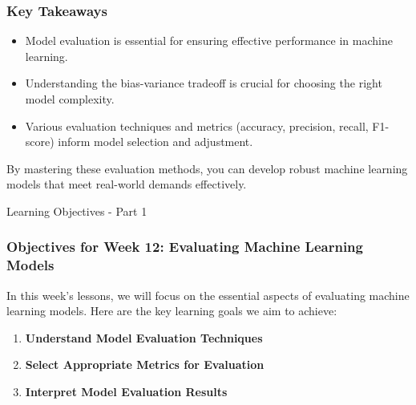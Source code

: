 \documentclass[aspectratio=169]{beamer}
\begin{document}
\begin{frame}[fragile]
    \frametitle{Key Takeaways}
    \begin{itemize}
        \item Model evaluation is essential for ensuring effective performance in machine learning.
        \item Understanding the bias-variance tradeoff is crucial for choosing the right model complexity.
        \item Various evaluation techniques and metrics (accuracy, precision, recall, F1-score) inform model selection and adjustment.
    \end{itemize}
    By mastering these evaluation methods, you can develop robust machine learning models that meet real-world demands effectively.
\end{frame}

\begin{frame}[fragile]{Learning Objectives - Part 1}
    \frametitle{Objectives for Week 12: Evaluating Machine Learning Models}
    
    In this week’s lessons, we will focus on the essential aspects of evaluating machine learning models. Here are the key learning goals we aim to achieve:
    
    \begin{enumerate}
        \item \textbf{Understand Model Evaluation Techniques}
        \item \textbf{Select Appropriate Metrics for Evaluation}
        \item \textbf{Interpret Model Evaluation Results}
    \end{enumerate}
\end{frame}
\end{document}
